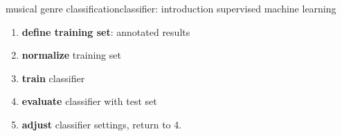         \begin{frame}{musical genre classification}{classifier: introduction}
            supervised machine learning
            \begin{enumerate}
                \item	\textbf{define training set}: annotated results
                \smallskip
                \item<2->	\textbf{normalize} training set
                \smallskip
                \item<3->	\textbf{train} classifier
                \smallskip
                \item<4->	\textbf{evaluate} classifier with test set
                \smallskip
                \item<5->	\textbf{adjust} classifier settings, return to 4.
            \end{enumerate}
        \end{frame}
